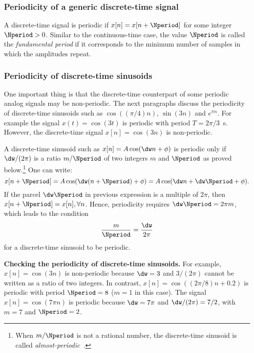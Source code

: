 \subsubsection{Periodicity of a generic discrete-time signal}

A discrete-time signal is periodic if $x[n] = x[n+\Nperiod]$ for some integer $\Nperiod>0$. 
Similar to the continuous-time case, the value $\Nperiod$ is called the \emph{fundamental period} if it corresponds to the minimum number of samples in which the amplitudes repeat.

\subsubsection{Periodicity of discrete-time sinusoids}

One important thing is that the discrete-time counterpart of some periodic analog signals may be non-periodic. The next paragraphs discuss the periodicity of discrete-time sinusoids such as $\cos((\pi/4)n)$, $\sin(3n)$ and $e^{\pi n}$.
For example the signal $x(t)=\cos(3 t)$ is periodic with period $T=2 \pi / 3$~s. However, the discrete-time signal $x[n]=\cos(3 n)$ is non-periodic.

A discrete-time sinusoid such as $x[n]=A \cos(\dw n + \phi)$ is periodic only if $\dw/(2 \pi)$ is a ratio $m/\Nperiod$ of two integers $m$ and $\Nperiod$ as proved below.\footnote{When $m/\Nperiod$ is not a rational number, the discrete-time sinusoid is called \emph{almost-periodic}~\cite{Corduneanu68,Giannakis99}.} One can write:
\[
x[n+\Nperiod] = A \cos(\dw (n+\Nperiod) + \phi) = A \cos(\dw n + \dw \Nperiod + \phi).
\]
If the parcel $\dw \Nperiod$ in previous expression is a multiple of $2 \pi$, then $x[n+\Nperiod]=x[n], \forall n$. Hence, periodicity requires $\dw \Nperiod = 2 \pi m$, which leads to the condition
\begin{equation}
\frac{m}{\Nperiod} = \frac{\dw}{2 \pi}
\label{eq:sinusoidPeriodicityCondition}
\end{equation}
for a discrete-time sinusoid to be periodic. 

\bExample \textbf{Checking the periodicity of discrete-time sinusoids.}
For example, $x[n]=\cos(3 n)$ is non-periodic because $\dw=3$ and $3/(2\pi)$ cannot be written as a ratio of two integers. In contrast, $x[n]=\cos((2 \pi / 8) n + 0.2)$ is periodic with period $\Nperiod=8$ ($m=1$ in this case). The signal $x[n]=\cos(7 \pi n)$ is periodic because $\dw = 7 \pi$ and $\dw/(2\pi) = 7/2$, with $m=7$ and $\Nperiod=2$.
\eExample

